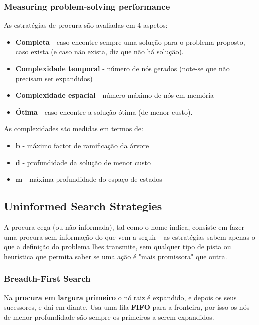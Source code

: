 \documentclass[11pt]{article}
\begin{document}
\subsubsection{Measuring problem-solving performance}

As estratégias de procura são avaliadas em 4 aspetos:
\begin{itemize}[topsep=4pt,itemsep=0pt]
    \item \textbf{Completa} - caso encontre sempre uma solução para o problema proposto, caso exista (e caso não exista, diz que não há solução).
    \item \textbf{Complexidade temporal} - número de nós gerados (note-se que não precisam ser expandidos)
    \item \textbf{Complexidade espacial} - número máximo de nós em memória
    \item \textbf{Ótima} - caso encontre a solução ótima (de menor custo).
\end{itemize}\vspace{4pt}

As complexidades são medidas em termos de:
\begin{itemize}[topsep=4pt,itemsep=0pt]
    \item $\boldsymbol{b}$ - máximo factor de ramificação da árvore
    \item $\boldsymbol{d}$ - profundidade da solução de menor custo
    \item $\boldsymbol{m}$ - máxima profundidade do espaço de estados
\end{itemize}

\subsection{Uninformed Search Strategies}

A procura cega (ou não informada), tal como o nome indica, consiste em fazer uma procura sem informação do que vem a seguir - as estratégias sabem apenas o que a definição do problema lhes transmite, sem qualquer tipo de pista ou heurística que permita saber se uma ação é "mais promissora" que outra.

\subsubsection{Breadth-First Search}

Na \textbf{procura em largura primeiro }o nó raiz é expandido, e depois os seus sucessores, e daí em diante. Usa uma fila \textbf{FIFO} para a fronteira, por isso os nós de menor profundidade são sempre os primeiros a serem expandidos.
\end{document}
